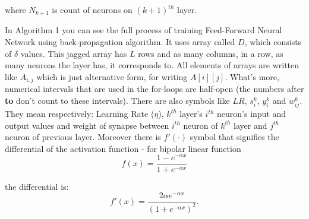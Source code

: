\documentclass[conference]{IEEEtran}
\begin{document}
\vspace{5pt}   
\noindent where $N_{k+1}$ is count of neurons on $(k+1)^{th}$ layer.

\vspace{15pt}
In Algorithm 1 you can see the full process of training Feed-Forward Neural Network using back-propagation algorithm. It uses array called $D$, which consists of $\delta$ values. This jagged array has $L$ rows and as many columns, in a row, as many neurons the layer has, it corresponds to. All elements of arrays are written like $A_{i,j}$ which is just alternative form, for writing $A[i][j]$. What's more, numerical intervals that are used in the for-loops are half-open (the numbers after \textbf{to} don't count to these intervals). There are also symbols like $LR$, $s^k_i$, $y^k_i$ and $w^{k}_{ij}$. They mean respectively: Learning Rate ($\eta$), $k^{th}$ layer's $i^{th}$ neuron's input and output values and weight of synapse between $i^{th}$ neuron of $k^{th}$ layer and $j^{th}$ neuron of previous layer. Moreover there is $f'(\cdot)$ symbol that signifies the differential of the activation function - for bipolar linear function 
\vspace{5pt}
\begin{equation*}
   f(x) = \frac{1 - e^{-\alpha x}}{1 + e^{-\alpha x}} 
\end{equation*}

\vspace{5pt}
\noindent the differential is:
\vspace{5pt}
\begin{equation*}
f'(x) = \frac{2 \alpha e^{-\alpha x}}{(1 + e^{-\alpha x})^2}.    
\end{equation*}

\newpage
\end{document}
